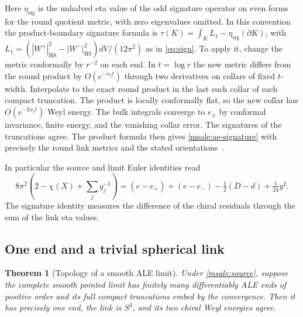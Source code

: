 \documentclass[11pt]{article}
\numberwithin{equation}{section}
\newtheorem{theorem}{Theorem}[section]
\theoremstyle{definition}
\theoremstyle{remark}
\newcommand{\HS}{\mathrm{HS}}
\begin{document}
Here \(\eta_{\mathrm{sig}}\) is the unhalved eta value of the
odd signature operator on even forms for the round quotient
metric, with zero eigenvalues omitted. In this convention the
product-boundary signature formula is
\(\tau(K)=\int_K L_1-\eta_{\mathrm{sig}}(\partial K)\), with
\(L_1=(|W^+|_{\HS}^2-|W^-|_{\HS}^2)dV/(12\pi^2)\)
as in \eqref{eq:sign}. To apply it, change the metric
conformally by \(r^{-2}\) on each end. In \(t=\log r\) the
new metric differs from the round product by \(O(e^{-\alpha_j t})\)
through two derivatives on collars of fixed \(t\)-width.
Interpolate to the exact round product in the last such collar
of each compact truncation. The product is locally conformally
flat, so the new collar has \(O(e^{-2\alpha_j t})\) Weyl energy.
The bulk integrals converge to \(e_\pm\) by conformal invariance,
finite energy, and the vanishing collar error. The signatures
of the truncations agree. The product formula then gives
\eqref{msale:ae-signature} with precisely the round link metrics
and the stated orientations~\cite[Theorem (4.14)]{APS1975SpectralI}.

In particular the source and limit Euler identities read
\begin{equation}\label{msale:euler-residual}
 8\pi^2\left(2-\chi(X)+\sum_j q_j^{-1}\right)
   =(e-e_+)+(e-e_-)-\tfrac12(D-d)+\tfrac1{24}y^2 .
\end{equation}
The signature identity measures the difference of the chiral
residuals through the sum of the link eta values.

\subsection{One end and a trivial spherical link}

\begin{theorem}[Topology of a smooth ALE limit]\label{msale:ends}
Under \eqref{msale:source}, suppose the complete smooth pointed
limit has finitely many differentiably ALE ends of positive order
and its full compact truncations embed by the convergence.
Then it has precisely one end, the link is \(S^3\), and its two
chiral Weyl energies agree.
\end{theorem}
\end{document}
